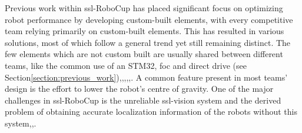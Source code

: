Previous work within \ac{ssl}-RoboCup has placed significant focus on optimizing robot performance by developing custom-built elements, with every competitive team relying primarily on custom-built elements. This has resulted in various solutions, most of which follow a general trend yet still remaining distinct. 
The few elements which are not custom built are usually shared between different teams, like the common use of an STM32, \ac{foc} and direct drive (see Section\:\ref{section:previous_work})\:\cite{veeraghanta_2024_2024},\cite{abousaleh_2024_2024},\cite{liang_icrs-fc_2024},\cite{delft_mercurians_delft_2024},\cite{salehi_immortals_2024},\cite{ryll_extended_2020}. A common feature present in most teams' design is the effort to lower the robot's centre of gravity\:\cite{huang_zjunlict_2020}.
One of the major challenges in \ac{ssl}-RoboCup is the unreliable \ac{ssl}-vision system and the derived problem of obtaining accurate localization information of the robots without this system\:\cite{huang_zjunlict_2019},\cite{bohm_er-force_2024},\cite{melo_towards_2022}.



